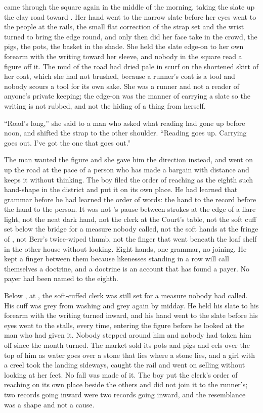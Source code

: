 \scenebreak

 came through the square again in the middle of the morning, taking the slate up the clay road toward . Her hand went to the narrow slate before her eyes went to the people at the rails, the small flat correction of the strap set and the wrist turned to bring the edge round, and only then did her face take in the crowd, the pigs, the pots, the basket in the shade. She held the slate edge-on to her own forearm with the writing toward her sleeve, and nobody in the square read a figure off it. The mud of the road had dried pale in scurf on the shortened skirt of her coat, which she had not brushed, because a runner's coat is a tool and nobody scours a tool for its own sake. She was a runner and not a reader of anyone's private keeping; the edge-on was the manner of carrying a slate so the writing is not rubbed, and not the hiding of a thing from herself.

“Road's long,” she said to a man who asked what reading had gone up before noon, and shifted the strap to the other shoulder. “Reading goes up. Carrying goes out. I've got the one that goes out.”

The man wanted the figure and she gave him the direction instead, and went on up the road at the pace of a person who has made a bargain with distance and keeps it without thinking. The boy filed the order of reaching as the eighth such hand-shape in the district and put it on its own place. He had learned that grammar before he had learned the order of words: the hand to the record before the hand to the person. It was not 's pause between strokes at the edge of a flare light, not the neat dark hand, not the clerk at the Court's table, not the soft cuff set below the bridge for a measure nobody called, not the soft hands at the fringe of , not Berr's twice-wiped thumb, not the finger that went beneath the loaf shelf in the other house without looking. Eight hands, one grammar, no joining. He kept a finger between them because likenesses standing in a row will call themselves a doctrine, and a doctrine is an account that has found a payer. No payer had been named to the eighth.

Below , at , the soft-cuffed clerk was still set for a measure nobody had called. His cuff was grey from washing and grey again by midday. He held his slate to his forearm with the writing turned inward, and his hand went to the slate before his eyes went to the stalls, every time, entering the figure before he looked at the man who had given it. Nobody stepped around him and nobody had taken him off since the month turned. The market sold its pots and pigs and eels over the top of him as water goes over a stone that lies where a stone lies, and a girl with a creel took the landing sideways, caught the rail and went on selling without looking at her feet. No fall was made of it. The boy put the clerk's order of reaching on its own place beside the others and did not join it to the runner's; two records going inward were two records going inward, and the resemblance was a shape and not a cause.


